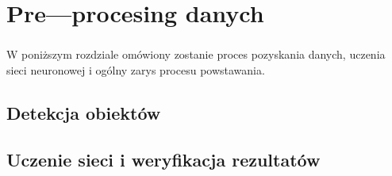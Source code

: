 \chapter{Pre---procesing danych} \label{ch:preprocesing}
\subsection*{} \noindent W poniższym rozdziale omówiony zostanie proces pozyskania danych, uczenia sieci neuronowej i ogólny zarys procesu powstawania.



\section{Detekcja obiektów}
\section{Uczenie sieci i weryfikacja rezultatów}
